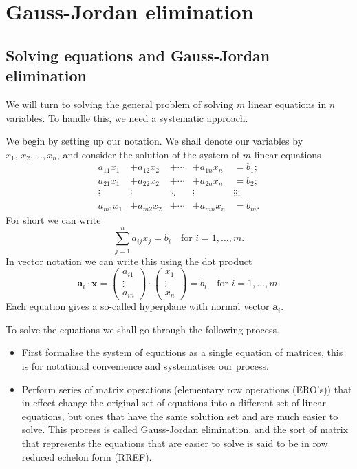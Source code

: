 \documentclass[10pt, a4paper]{article}
\newcommand{\mbf}[1]{\mathbf{#1}}
\begin{document}
\newpage

\section{Gauss-Jordan elimination}

\subsection{Solving equations and Gauss-Jordan elimination}
We will turn to solving the general problem of solving $m$ linear equations in $n$ variables. To handle this, we need a systematic approach.

We begin by setting up our notation. We shall denote our variables by $x_1,\,x_2,\dotsc,x_n$, and consider the solution of the system of $m$ linear equations
\begin{align*}
    a_{1 1}x_{1} &+ a_{1 2}x_2 &+ \dotsi &+ a_{1 n}x_n &= b_1; \\ 
    a_{2 1}x_{1} &+ a_{2 2}x_2 &+ \dotsi &+ a_{2 n}x_n &= b_2; \\ 
    \vdots & \vdots & \ddots & \vdots &\vdots \vdots; \\ 
    a_{m 1}x_{1} &+ a_{m 2}x_2 &+ \dotsi &+ a_{m n}x_n &= b_m.
\end{align*}
For short we can write
\[
\sum_{j = 1}^{n}a_{ij}x_{j} = b_{i}\quad\text{for } i = 1,\dotsc,m.
\]
In vector notation we can write this using the dot product
\[
\mbf{a}_i \cdot \mbf{x} = \begin{pmatrix}
    a_{i 1} \\ \vdots \\ a_{i n}
\end{pmatrix}
\cdot
\begin{pmatrix}
    x_1 \\ \vdots \\ x_n
\end{pmatrix}
=
b_i\quad\text{for } i = 1, \dotsc, m.
\]
Each equation gives a so-called hyperplane with normal vector $\mbf{a}_i$.

To solve the equations we shall go through the following process.
\begin{itemize}
    \item First formalise the system of equations as a single equation of matrices, this is for notational convenience and systematises our process.
    \item Perform series of matrix operations (elementary row operations (ERO's)) that in effect change the original set of equations into a different set of linear equations, but ones that have the same solution set and are much easier to solve. This process is called Gauss-Jordan elimination, and the sort of matrix that represents the equations that are easier to solve is said to be in row reduced echelon form (RREF).
\end{itemize}
\end{document}
